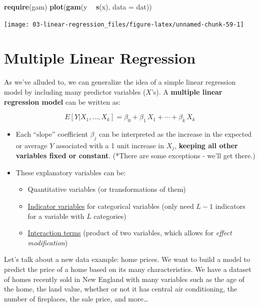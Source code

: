 \documentclass[
]{book}
\newenvironment{Shaded}{\begin{snugshade}}{\end{snugshade}}
\newcommand{\DataTypeTok}[1]{\textcolor[rgb]{0.13,0.29,0.53}{#1}}
\newcommand{\KeywordTok}[1]{\textcolor[rgb]{0.13,0.29,0.53}{\textbf{#1}}}
\newcommand{\NormalTok}[1]{#1}
\newcommand{\OperatorTok}[1]{\textcolor[rgb]{0.81,0.36,0.00}{\textbf{#1}}}
\newcommand{\StringTok}[1]{\textcolor[rgb]{0.31,0.60,0.02}{#1}}
\providecommand{\tightlist}{%
  \setlength{\itemsep}{0pt}\setlength{\parskip}{0pt}}
\begin{document}
\begin{Shaded}
\begin{Highlighting}[]
\KeywordTok{require}\NormalTok{(gam)}
\KeywordTok{plot}\NormalTok{(}\KeywordTok{gam}\NormalTok{(y }\OperatorTok{~}\StringTok{ }\KeywordTok{s}\NormalTok{(x), }\DataTypeTok{data =}\NormalTok{ dat))}
\end{Highlighting}
\end{Shaded}

\begin{center}\texttt{[image: 03-linear-regression\_files/figure-latex/unnamed-chunk-59-1]} \end{center}

\hypertarget{multiple}{%
\section{Multiple Linear Regression}\label{multiple}}

As we've alluded to, we can generalize the idea of a simple linear regression model by including many predictor variables (\(X\)'s). A \textbf{multiple linear regression model} can be written as:

\[ E[Y |X_1,...,X_k ] = \beta_0 + \beta_1\,X_{1} + \cdots + \beta_k\,X_{k}  \]

\begin{itemize}
\item
  Each ``slope'' coefficient \(\beta_j\) can be interpreted as the increase in the expected or average \(Y\) associated with a 1 unit increase in \(X_j\), \textbf{keeping all other variables fixed or constant}. (*There are some exceptions - we'll get there.)
\item
  These explanatory variables can be:

  \begin{itemize}
  \tightlist
  \item
    Quantitative variables (or transformations of them)
  \item
    \protect\hyperlink{indicator-variables}{Indicator variables} for categorical variables (only need \(L-1\) indicators for a variable with \(L\) categories)
  \item
    \protect\hyperlink{interaction-variables}{Interaction terms} (product of two variables, which allows for \emph{effect modification})
  \end{itemize}
\end{itemize}

Let's talk about a new data example: home prices. We want to build a model to predict the price of a home based on its many characteristics. We have a dataset of homes recently sold in New England with many variables such as the age of the home, the land value, whether or not it has central air conditioning, the number of fireplaces, the sale price, and more\ldots{}
\end{document}
